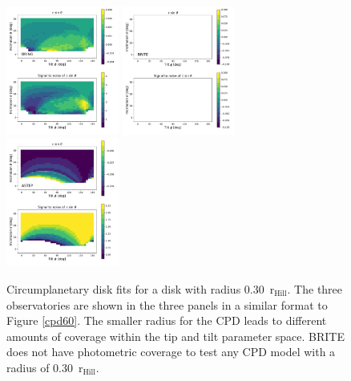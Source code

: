 \documentclass[longauth]{aa} %
\newcommand{\rhill}{$\mathrm{r_{Hill}}$} %
\begin{document}
\begin{figure}[htb]
    \includegraphics[width=0.33\textwidth]{diskfit_BRING_030.pdf}
    \includegraphics[width=0.33\textwidth]{diskfit_BRITE_030.pdf}
    \includegraphics[width=0.33\textwidth]{diskfit_ASTEP_030.pdf}
    \caption{Circumplanetary disk fits for a disk with radius 0.30\ \rhill. The three observatories are shown in the three panels in a similar format to Figure \ref{cpd60}. The smaller radius for the CPD leads to different amounts of coverage within the tip and tilt parameter space. BRITE does not have photometric coverage to test any CPD model with a radius of 0.30\ \rhill.}
    \label{cpd30}
\end{figure}
\end{document}
